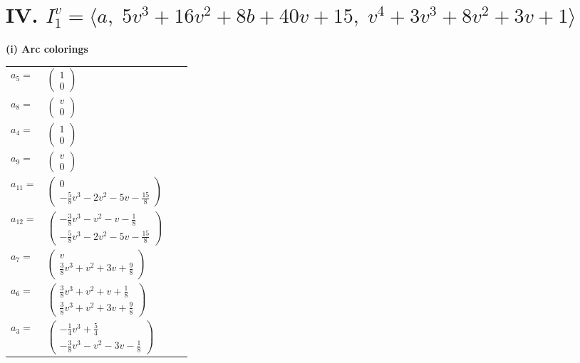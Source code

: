 \documentclass[1p]{elsarticle_modified}
\theoremstyle{definition}
\begin{document}
\centering \section*{IV. $I^v_{1}= \langle a,\;5 v^3+16 v^2+8 b+40 v+15,\;v^4+3 v^3+8 v^2+3 v+1 \rangle$}
\flushleft \textbf{(i) Arc colorings}\\
\begin{tabular}{m{7pt} m{180pt} m{7pt} m{180pt} }
\flushright $a_{5}=$&$\begin{pmatrix}1\\0\end{pmatrix}$ \\
\flushright $a_{8}=$&$\begin{pmatrix}v\\0\end{pmatrix}$ \\
\flushright $a_{4}=$&$\begin{pmatrix}1\\0\end{pmatrix}$ \\
\flushright $a_{9}=$&$\begin{pmatrix}v\\0\end{pmatrix}$ \\
\flushright $a_{11}=$&$\begin{pmatrix}0\\-\frac{5}{8} v^3-2 v^2-5 v-\frac{15}{8}\end{pmatrix}$ \\
\flushright $a_{12}=$&$\begin{pmatrix}-\frac{3}{8} v^3- v^2- v-\frac{1}{8}\\-\frac{5}{8} v^3-2 v^2-5 v-\frac{15}{8}\end{pmatrix}$ \\
\flushright $a_{7}=$&$\begin{pmatrix}v\\\frac{3}{8} v^3+v^2+3 v+\frac{9}{8}\end{pmatrix}$ \\
\flushright $a_{6}=$&$\begin{pmatrix}\frac{3}{8} v^3+v^2+v+\frac{1}{8}\\\frac{3}{8} v^3+v^2+3 v+\frac{9}{8}\end{pmatrix}$ \\
\flushright $a_{3}=$&$\begin{pmatrix}-\frac{1}{4} v^3+\frac{5}{4}\\-\frac{3}{8} v^3- v^2-3 v-\frac{1}{8}\end{pmatrix}$ \\

\end{tabular}
\end{document}
